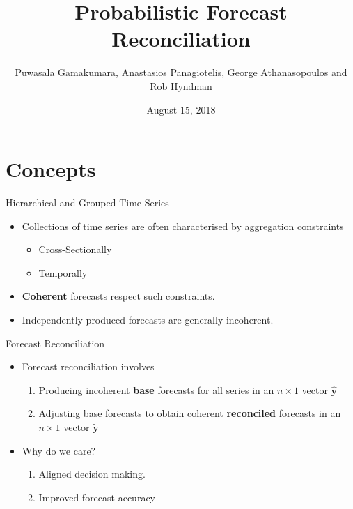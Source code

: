 \documentclass{beamer}
\title{Probabilistic Forecast Reconciliation}
\date{August 15, 2018}
\author[GPAH]{Puwasala Gamakumara, Anastasios Panagiotelis, George Athanasopoulos and Rob Hyndman}
\begin{document}
  \begin{frame}
    \maketitle
  \end{frame}
  \section{Concepts}
  \begin{frame}{Hierarchical and Grouped Time Series}
  	\begin{itemize}
  	  \item Collections of time series are often characterised by aggregation constraints
  	  \begin{itemize}
  	    \item Cross-Sectionally
  		\item Temporally
  	  \end{itemize}
      \item {\bf Coherent} forecasts respect such constraints. 
      \item Independently produced forecasts are generally incoherent.
  \end{itemize}
\begin{figure}
	\begin{center}
		  
		 
		\qobitree
	\end{center}
\end{figure}
\end{frame}  
  \begin{frame}{Forecast Reconciliation}
  	\begin{itemize}
  	  \item Forecast reconciliation involves
  	  \begin{enumerate}
  	  	\item Producing incoherent {\bf base} forecasts for all series in an $n\times 1$ vector $\hat{\bm y}$
        \item Adjusting base forecasts to obtain coherent {\bf reconciled} forecasts in an $n\times 1$ vector $\tilde{\bm y}$
  	  \end{enumerate} 
      \item Why do we care?
        \begin{enumerate}
        	\item Aligned decision making.
        	\item Improved forecast accuracy
        \end{enumerate}
  	\end{itemize}
  \end{frame}
\end{document}
